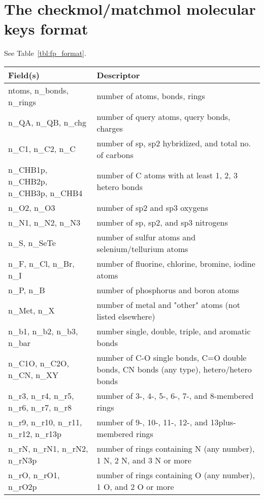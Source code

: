 \documentclass[a4paper]{article}
\begin{document}
\section{The checkmol/matchmol molecular keys format}
See Table~\ref{tbl:fp_format}.
\begin{table}[tbp]
\begin{tabular}{|l|p{8cm}|}
\hline 
	\textbf{Field(s)} & \textbf{Descriptor}\\
	\hline 
   ntoms, n\_bonds, n\_rings	& number of atoms, bonds, rings\\
   \hline 
   n\_QA, n\_QB, n\_chg	& number of query atoms, query bonds, charges\\
   \hline 
   n\_C1, n\_C2, n\_C
  & number of sp, sp2 hybridized, and total no. of carbons\\
  \hline 
   n\_CHB1p, n\_CHB2p, n\_CHB3p, n\_CHB4
  & number of C atoms with at least 1, 2, 3 hetero bonds\\
  \hline 
   n\_O2, n\_O3		& number of sp2 and sp3 oxygens\\
   \hline 
   n\_N1, n\_N2, n\_N3		& number of sp, sp2, and sp3 nitrogens\\
   \hline 
   n\_S, n\_SeTe
  & number of sulfur atoms and selenium/tellurium atoms\\
  \hline 
   n\_F, n\_Cl, n\_Br, n\_I
  & number of fluorine, chlorine, bromine, iodine atoms\\
  \hline 
   n\_P, n\_B			& number of phosphorus and boron atoms\\
   \hline 
   n\_Met, n\_X
  & number of metal and "other" atoms (not listed elsewhere)\\
  \hline 
   n\_b1, n\_b2, n\_b3, n\_bar
  & number single, double, triple, and aromatic bonds\\
  \hline 
   n\_C1O, n\_C2O, n\_CN, n\_XY
  & number of C-O single bonds, C=O double bonds, CN bonds (any type), hetero/hetero bonds\\
  \hline 
   n\_r3, n\_r4, n\_r5, n\_r6, n\_r7, n\_r8
  & number of 3-, 4-, 5-, 6-, 7-, and 8-membered rings\\
  \hline 
   n\_r9, n\_r10, n\_r11, n\_r12, n\_r13p
  & number of 9-, 10-, 11-, 12-, and 13plus-membered rings\\
  \hline 
   n\_rN, n\_rN1, n\_rN2, n\_rN3p
  & number of rings containing N (any number), 1 N, 2 N, and 3 N or more\\
  \hline 
   n\_rO, n\_rO1, n\_rO2p
  & number of rings containing O (any number), 1 O, and 2 O or more\\

\end{tabular}
\end{table}
\end{document}
